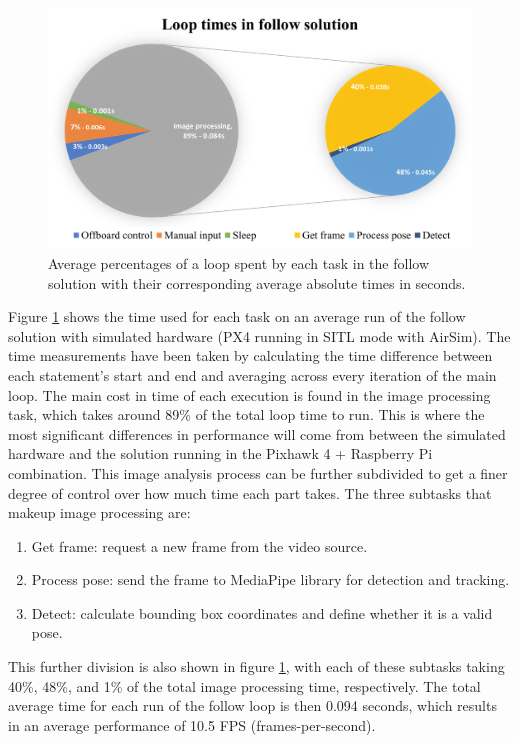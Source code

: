 \begin{figure}
  \centering
  \includegraphics[width=.8\textwidth, keepaspectratio]{img/sitl-performance.png}
  \caption{Average percentages of a loop spent by each task in the follow solution with their corresponding average absolute times in seconds.}
  \label{fig:perf-sitl-sim}
\end{figure}

Figure \ref{fig:perf-sitl-sim} shows the time used for each task on an average run of the follow solution with simulated hardware (PX4 running in SITL mode with AirSim).
The time measurements have been taken by calculating the time difference between each statement's start and end and averaging across every iteration of the main loop.
The main cost in time of each execution is found in the image processing task, which takes around 89\% of the total loop time to run.
This is where the most significant differences in performance will come from between the simulated hardware and the solution running in the Pixhawk 4 + Raspberry Pi combination.
This image analysis process can be further subdivided to get a finer degree of control over how much time each part takes.
The three subtasks that makeup image processing are:
\begin{enumerate}
    \item Get frame: request a new frame from the video source.
    \item Process pose: send the frame to MediaPipe library for detection and tracking.
    \item Detect: calculate bounding box coordinates and define whether it is a valid pose.
\end{enumerate}

This further division is also shown in figure \ref{fig:perf-sitl-sim}, with each of these subtasks taking 40\%, 48\%, and 1\% of the total image processing time, respectively.
The total average time for each run of the follow loop is then 0.094 seconds, which results in an average performance of 10.5 FPS (frames-per-second).


